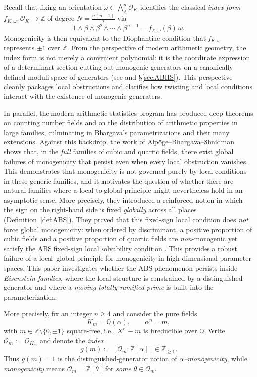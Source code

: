 \documentclass[11pt,letterpaper]{amsart}
\newcommand{\Z}{\mathbb{Z}}
\newcommand{\Q}{\mathbb{Q}}
\newcommand{\Ocal}{\mathcal{O}}
\theoremstyle{plain}
\theoremstyle{definition}
\theoremstyle{remark}
\theoremstyle{plain}
\begin{document}
Recall that fixing an orientation $\omega\in\bigwedge_\Z^n\Ocal_K$ identifies the classical \emph{index form}
$f_{K,\omega}:\Ocal_K\to\Z$ of degree $N=\frac{n(n-1)}2$ via
\[
1\wedge \beta\wedge \beta^2\wedge\cdots\wedge \beta^{n-1}
=
f_{K,\omega}(\beta)\,\omega.
\]
Monogenicity is then equivalent to the Diophantine condition that $f_{K,\omega}$ represents $\pm1$ over $\Z$. From the perspective of modern arithmetic geometry, the index form is not merely a convenient polynomial: it is the coordinate expression of a determinant section cutting out monogenic generators on a canonically defined moduli space of generators (see \cite{ABHS-I,ABHS-II} and \S\ref{sec:ABHS}). This perspective cleanly packages local obstructions and clarifies how twisting and local conditions interact with the existence of monogenic generators.

In parallel, the modern arithmetic-statistics program has produced deep theorems on counting number fields and on the distribution of arithmetic properties in large families, culminating in Bhargava's parametrizations and their many extensions. Against this backdrop, the work of Alp\"oge--Bhargava--Shnidman shows that, in the \emph{full} families of cubic and quartic fields, there exist global failures of monogenicity that persist even when every local obstruction vanishes. This demonstrates that monogenicity is not governed purely by local conditions in these generic
families, and it motivates the question of whether there are natural families where a local-to-global principle might nevertheless hold in an asymptotic sense. More precisely, they introduced a reinforced notion in which the sign on the right-hand side is fixed \emph{globally} across all places (Definition~\ref{def:ABS}). They proved that this fixed-sign local condition does \emph{not} force global monogenicity: when ordered by discriminant, a positive proportion of cubic fields and a positive proportion of quartic fields are \emph{non}-monogenic yet satisfy the ABS fixed-sign local solvability condition \cite{ABSCubic,ABSQuartic}. This provides a robust failure of a local--global principle for monogenicity in high-dimensional parameter spaces. This paper investigates whether the ABS phenomenon persists inside \emph{Eisenstein families}, where the local structure is constrained by a distinguished generator and where a \emph{moving totally ramified prime} is built into the parameterization. 

More precisely, fix an integer $n\ge4$ and consider the pure fields
\[
K_m=\Q(\alpha),\qquad \alpha^n=m,
\]
with $m\in\Z\setminus\{0,\pm 1\}$ square-free, i.e., $X^n-m$ is irreducible over $\Q$. Write $\Ocal_m:=\Ocal_{K_m}$ and denote the \emph{index}
\[
g(m):=[\Ocal_m:\Z[\alpha]]\in\Z_{\ge1}.
\]
Thus $g(m)=1$ is the distinguished-generator notion of \emph{$\alpha$--monogenicity}, while \emph{monogenicity} means $\Ocal_m=\Z[\theta]$ for \emph{some} $\theta\in\Ocal_m$.
\end{document}
